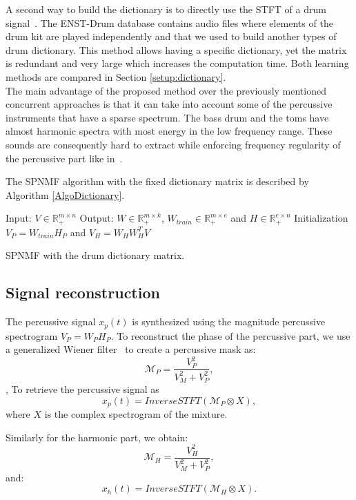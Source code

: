 A second way to build the dictionary is to directly use the STFT of a drum signal~\cite{wudrum}. The ENST-Drum database contains audio files where elements of the drum kit are played independently and that we used to build another types of drum dictionary. This method allows having a specific dictionary, yet the matrix is redundant and very large which increases the computation time. Both learning methods are compared in Section \ref{setup:dictionary}. \\

The main advantage of the proposed method over the previously mentioned concurrent approaches is that it can take into account some of the percussive instruments that have a sparse spectrum. The bass drum and the toms have almost harmonic spectra with most energy in the low frequency range. These sounds are consequently hard to extract while enforcing frequency regularity of the percussive part like in~\cite{canadas2014percussive,ono2008separation}.

The SPNMF algorithm with the fixed dictionary matrix is described by Algorithm \ref{AlgoDictionary}.
 
\begin{algorithm}[h]
 Input: $V \in \mathbb{R}_{+}^{m \times n} $
 Output: $W \in \mathbb{R}_{+}^{m \times k}$, $W_{train} \in \mathbb{R}_+^{m \times e}$ and $H \in \mathbb{R}_{+}^{e \times n}$
 Initialization\;
 $ V_P = W_{train}H_P $ and
 $ V_H = W_HW_H^TV $ 
  
\vspace{0.2cm}
 \caption{SPNMF with the drum dictionary matrix.}\label{AlgoDictionary}
\end{algorithm}


 
 
\subsection{Signal reconstruction}

The percussive signal $x_p(t)$ is synthesized using the magnitude percussive spectrogram $V_P = W_PH_P$. To reconstruct the phase of the percussive part, we use a generalized Wiener filter~\cite{liutkus:hal-01110028} to create a percussive mask as:
\begin{equation}
\mathcal{M}_P = \frac{V_P^2}{V_M^2 + V_P^2},
\end{equation} 
\noindent, To retrieve the percussive signal as 
\begin{equation}
x_p(t) = InverseSTFT(\mathcal{M}_P \otimes X),
\end{equation}
\noindent where $X$ is the complex spectrogram of the mixture.

Similarly for the harmonic part, we obtain:
\begin{equation}\label{percuwiener}
\mathcal{M}_H = \frac{V_H^2}{V_M^2 + V_P^2},
\end{equation}
and:
\begin{equation}
x_h(t) = InverseSTFT(\mathcal{M}_H \otimes X).
\end{equation}


